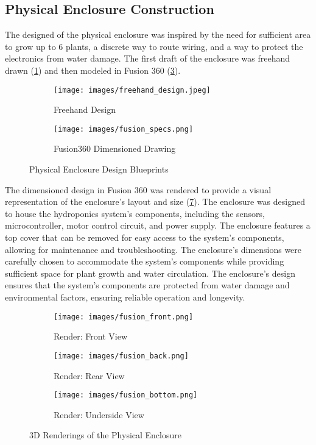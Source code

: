 \documentclass[12pt]{article} %
\begin{document}
\subsection{Physical Enclosure Construction}
\noindent The designed of the physical enclosure was inspired by the need for sufficient area to grow up to 6 plants, a discrete way to route wiring, and a way to protect the electronics from water damage. The first draft of the enclosure was freehand drawn (\ref{fig:freehand}) and then modeled in Fusion 360 (\ref{fig:blueprints}). 
\begin{figure}[H]
    \centering
    \begin{subfigure}[b]{0.5\textwidth}
        \centering
        \texttt{[image: images/freehand\_design.jpeg]}
        \caption{Freehand Design}
        \label{fig:freehand}
    \end{subfigure}
    \hfill
    \begin{subfigure}[b]{0.5\textwidth}
        \centering
        \texttt{[image: images/fusion\_specs.png]}
        \caption{Fusion360 Dimensioned Drawing}
        \label{fig:fusionSpecs}
    \end{subfigure}
    \caption{Physical Enclosure Design Blueprints}
    \label{fig:blueprints}
\end{figure}
\noindent The dimensioned design in Fusion 360 was rendered to provide a visual representation of the enclosure's layout and size (\ref{fig:renderings}). The enclosure was designed to house the hydroponics system's components, including the sensors, microcontroller, motor control circuit, and power supply. The enclosure features a top cover that can be removed for easy access to the system's components, allowing for maintenance and troubleshooting. The enclosure's dimensions were carefully chosen to accommodate the system's components while providing sufficient space for plant growth and water circulation. The enclosure's design ensures that the system's components are protected from water damage and environmental factors, ensuring reliable operation and longevity.
\begin{figure}[H]
    \centering
    \begin{subfigure}[b]{0.3\textwidth}
        \centering
        \texttt{[image: images/fusion\_front.png]}
        \caption{Render: Front View}
        \label{fig:fusionfront}
    \end{subfigure}
    \hfill
    \begin{subfigure}[b]{0.3\textwidth}
        \centering
        \texttt{[image: images/fusion\_back.png]}
        \caption{Render: Rear View}
        \label{fig:fusionrear}
    \end{subfigure}
    \hfill
    \begin{subfigure}[b]{0.3\textwidth}
        \centering
        \texttt{[image: images/fusion\_bottom.png]}
        \caption{Render: Underside View}
        \label{fig:fusionbottom}
    \end{subfigure}
    \caption{3D Renderings of the Physical Enclosure}
    \label{fig:renderings}
\end{figure}
\end{document}
